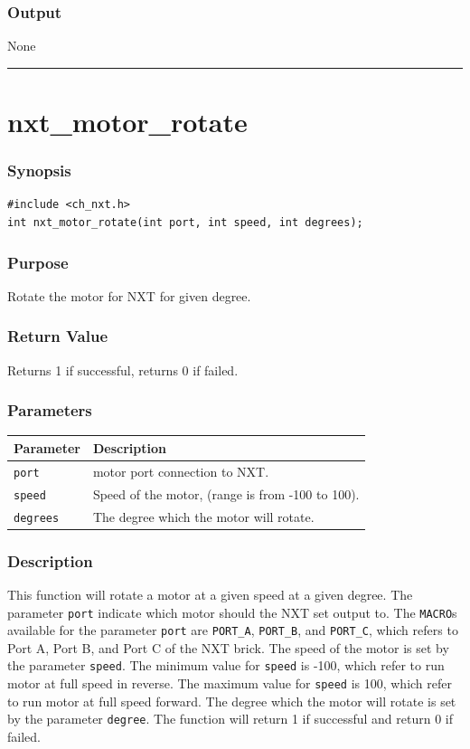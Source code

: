 \documentclass[12pt]{article}
\begin{document}
\subsubsection*{Output}
None 
\\

\hrule
\newpage

\section*{nxt\_motor\_rotate}

\subsubsection*{Synopsis}
\begin{verbatim}
#include <ch_nxt.h>
int nxt_motor_rotate(int port, int speed, int degrees);
\end{verbatim}

\subsubsection*{Purpose}
Rotate the motor for NXT for given degree.

\subsubsection*{Return Value}
Returns 1 if successful, returns 0 if failed.

\subsubsection*{Parameters}
\begin{tabular}{ l | p{12cm} }
Parameter		& Description\\ \hline
\verb+port+		& motor port connection to NXT.\\
\verb+speed+	& Speed of the motor, (range is from -100 to 100).\\
\verb+degrees+	& The degree which the motor will rotate.
\end{tabular}

\subsubsection*{Description}
This function will rotate a motor at a given speed at a given degree. 
The parameter \verb+port+ indicate which motor should the NXT set output to. 
The \verb+MACRO+s available for the parameter \verb+port+ are \verb+PORT_A+, 
\verb+PORT_B+, and \verb+PORT_C+, which refers to Port A, Port B, and Port C of the NXT brick. 
The speed of the motor is set by the parameter \verb+speed+. 
The minimum value for \verb+speed+ is -100, which refer to run motor at full speed in reverse. 
The maximum value for \verb+speed+ is 100, which refer to run motor at full speed forward. 
The degree which the motor will rotate is set by the parameter \verb+degree+. 
The function will return 1 if successful and return 0 if failed.
\end{document}
